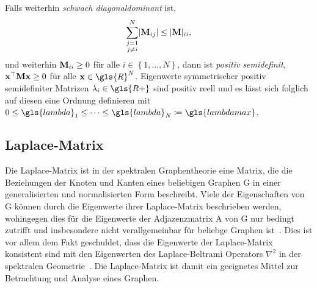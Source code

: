 Falls  weiterhin \emph{schwach diagonaldominant} ist, \dhe{}
\begin{equation}
  \sum_{\substack{j=1\\j \neq i}}^N \left|\ma{M}_{ij}\right| \leq \left|\ma{M}\right|_{ii},
  \label{eq:schwach_diagonaldominant}
\end{equation}
und weiterhin $\mathbf{M}_{ii} \geq 0$ für alle $i \in \left\{1, \ldots, N\right\}$, dann ist  \emph{positiv semidefinit}, \dhe{} $\mathbf{x}^{\top}\mathbf{M}\mathbf{x} \geq 0$ für alle $\ve{x} \in \gls{R}^{N}$.
Eigenwerte symmetrischer positiv semidefiniter Matrizen $\lambda_i \in \gls{R+}$ sind positiv reell und es lässt sich folglich auf diesen eine Ordnung definieren mit $0 \leq \gls{lambda}_1 \leq \cdots \leq \gls{lambda}_N \coloneqq \gls{lambdamax}$.

\subsection{Laplace-Matrix}
\label{laplace_matrix}

Die Laplace-Matrix ist in der spektralen Graphentheorie eine Matrix, die die Beziehungen der Knoten und Kanten eines beliebigen Graphen \gls{G} in einer generalisierten und normalisierten Form beschreibt.
Viele der Eigenschaften von \gls{G} können durch die Eigenwerte ihrer Laplace-Matrix beschrieben werden, wohingegen dies \zB{} für die Eigenwerte der Adjazenzmatrix \gls{A} von \gls{G} nur bedingt zutrifft und insbesondere nicht verallgemeinbar für beliebge Graphen ist~\cite{Chung}.
Dies ist vor allem dem Fakt geschuldet, dass die Eigenwerte der Laplace-Matrix konsistent sind mit den Eigenwerten des Laplace-Beltrami Operators $\nabla^2$ in der spektralen Geometrie~\cite{Chung}.
Die Laplace-Matrix ist damit ein geeignetes Mittel zur Betrachtung und Analyse eines Graphen.

